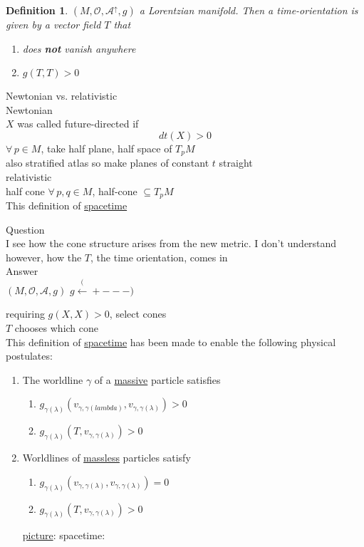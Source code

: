 \documentclass[10pt, twoside]{amsart}
\newtheorem{definition}{Definition}
\begin{document}
\begin{multicols*}{2}
\begin{definition}
  $(M,\mathcal{O},\mathcal{A}^{\uparrow},g)$ a Lorentzian manifold.  Then a time-orientation is given by a vector field $T$ that 
\begin{enumerate}
\item[(i)] does \textbf{not} vanish anywhere 
\item[(ii)] $g(T,T)>0$
\end{enumerate}
\end{definition}

Newtonian vs. relativistic \\
Newtonian \\
$X$ was called future-directed if 
\[
dt(X) >0
\]
$\forall \, p \in M$, take half plane, half space of $T_pM$ \\
also stratified atlas so make planes of constant $t$ straight \\
relativistic \\
half cone $\forall \, p, q \in M$, half-cone $\subseteq T_pM$ \\

This definition of \underline{spacetime}

Question \\
I see how the cone structure arises from the new metric. I don't understand however, how the $T$, the time orientation, comes in \\

Answer \\
$(M,\mathcal{O}, \mathcal{A},g)$ $g \xleftarrow (+---)$

requiring $g(X,X)>0$, select cones \\
$T$ chooses which cone \\

This definition of \underline{spacetime} has been made to enable the following physical postulates:
\begin{enumerate}
\item[(P1)] The worldline $\gamma$ of a \underline{massive} particle satisfies
\begin{enumerate}
  \item[(i)] $g_{\gamma(\lambda)}(v_{\gamma, \gamma(lambda)} , v_{\gamma,\gamma(\lambda)} ) >0$
  \item[(ii)] $g_{\gamma(\lambda)}(T, v_{\gamma,\gamma(\lambda)}) >0$
\end{enumerate}
\item[(P2)] Worldlines of \underline{massless} particles satisfy
\begin{enumerate}
\item[(i)] $g_{\gamma(\lambda)}(v_{\gamma,\gamma(\lambda)}, v_{\gamma,\gamma(\lambda)}) = 0$
\item[(ii)] $g_{\gamma(\lambda)}(T,v_{\gamma,\gamma(\lambda)}) >0$
\end{enumerate}
\underline{picture}: spacetime:
\end{enumerate}


\end{multicols*}
\end{document}
